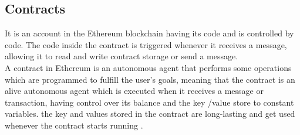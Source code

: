 \subsection{Contracts} 
It is an account in the Ethereum blockchain having its code and is controlled by code. The code inside the contract is triggered whenever it receives a message, allowing it to read and write contract storage or send a message. \\
A contract in Ethereum is an autonomous agent that performs some operations which are programmed to fulfill the user's goals, meaning that the contract is an alive autonomous agent which is executed when it receives a message or transaction, having control over its balance and the key /value store to constant variables.
the key and values stored in the contract are long-lasting and get used whenever the contract starts running \cite{Egbertsen}.

